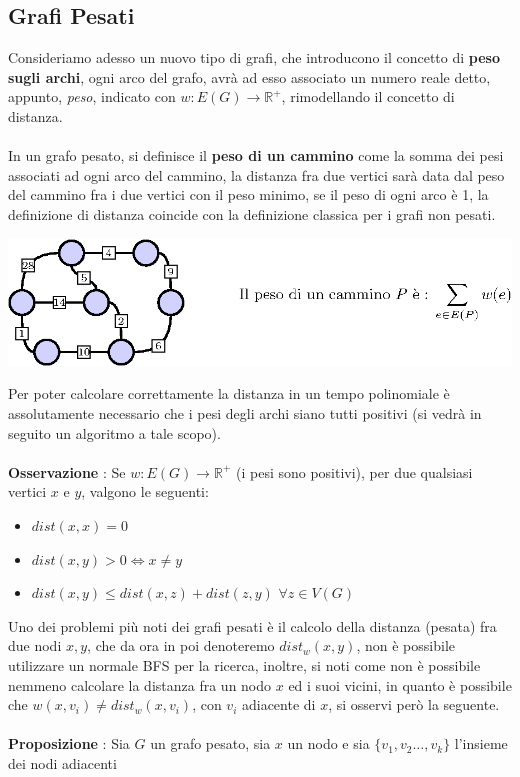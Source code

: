 \documentclass[12pt, letterpaper]{article}
\newcommand{\acc}{\\\hphantom{}\\}
\begin{document}
\subsection{Grafi Pesati}\label{grafiPesati}
Consideriamo adesso un nuovo tipo di grafi, che introducono il concetto di \textbf{peso sugli archi}, ogni arco del grafo,
avrà ad esso associato un numero reale detto, appunto, \textit{peso}, indicato con $w : E(G)\rightarrow \mathbb{R}^+$,
rimodellando il concetto di distanza.\acc
In un grafo pesato, si definisce il \textbf{peso di un cammino} come la somma dei pesi associati ad ogni arco del cammino,
la distanza fra due vertici sarà data dal peso del cammino fra i due vertici con il peso minimo, se il peso di ogni
arco è 1, la definizione di distanza coincide con la definizione classica per i grafi non pesati. \begin{center}
    \includegraphics[width=1\textwidth ]{images/grafoPesato.eps}
\end{center}
Per poter calcolare correttamente la distanza in un tempo polinomiale è assolutamente necessario che
i pesi degli archi siano tutti positivi (si vedrà in seguito un algoritmo a tale scopo).\acc
\textbf{Osservazione} : Se  $w : E(G)\rightarrow \mathbb{R}^+$ (i pesi sono positivi), per due qualsiasi
vertici $x$ e $y$, valgono le seguenti:\begin{itemize}
    \item $dist(x,x)=0$
    \item $dist(x,y)>0\iff x\ne y$
    \item $dist(x,y)\le dist(x,z)+dist(z,y)$ $\forall z\in V(G)$
\end{itemize}
Uno dei problemi più noti dei grafi pesati è il calcolo della distanza (pesata) fra due nodi $x,y$, che da ora in
poi denoteremo $dist_w(x,y)$, non è possibile utilizzare un normale BFS per la ricerca, inoltre, si noti come non è possibile
nemmeno calcolare la distanza fra un nodo $x$ ed i suoi vicini, in quanto è possibile che $w(x,v_i)\ne dist_w(x,v_i)$, con
$v_i$ adiacente di $x$, si osservi però la seguente.\acc
\textbf{Proposizione} : Sia $G$ un grafo pesato, sia $x$ un nodo e sia $\{v_1,v_2\dots,v_k\}$ l'insieme dei nodi adiacenti
\end{document}
